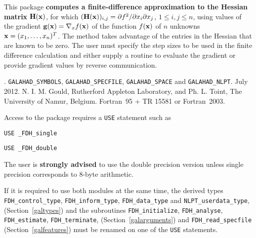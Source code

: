 \documentclass{galahad}
\newcommand{\packagename}{FDH}
\newcommand{\fullpackagename}{\libraryname\_\packagename}
\begin{document}
\galheader


\galsummary
This package
{\bf computes a finite-difference approximation to the Hessian matrix}
${\mathbf{H}}({\mathbf{x}})$, for which
$({\mathbf{H}}({\mathbf{x}}))_{i,j} = \partial f^2 / \partial x_i \partial x_j$,
$1 \leq i, j \leq n$,
using values of the gradient ${\mathbf{g}}({\mathbf{x}}) = \nabla_x f({\mathbf{x}})$
of the function $f({\mathbf{x}})$ of $n$ unknowns ${\mathbf{x}} = (x_1, \ldots, x_n)^T$.
The method takes advantage of the entries in the Hessian that are known to
be zero.  The user must specify the step sizes to be used in the
finite difference calculation and either supply a routine to evaluate
the gradient or provide gradient values by reverse communication.


\galattributes
\galversions{\tt  \fullpackagename\_single, \fullpackagename\_double}.
\galuses
{\tt GALAHAD\_SY\-M\-BOLS},
{\tt GALAHAD\_SP\-ECFILE},
{\tt GALAHAD\_SPACE} and
{\tt GALAHAD\_NLPT}.
\galdate July 2012.
\galorigin N. I. M. Gould, Rutherford Appleton Laboratory,
and Ph. L. Toint, The University of Namur, Belgium.
\gallanguage Fortran~95 + TR 15581 or Fortran~2003.


\galhowto


Access to the package requires a {\tt USE} statement such as

\medskip{}

\hspace{8mm} {\tt USE \fullpackagename\_single}

\medskip{}

\hspace{8mm} {\tt USE  \fullpackagename\_double}

\medskip

\noindent
The user is {\bf strongly advised} to use the double
precision version unless single precision corresponds to 8-byte arithmetic.

If it is required to use both modules at the same time, the derived types
{\tt \packagename\_control\_type},
{\tt \packagename\_inform\_type},
{\tt \packagename\_data\_type}
and
{\tt NLPT\_userdata\_type},
(Section~\ref{galtypes})
and the subroutines
{\tt \packagename\_initialize},
{\tt \packagename\_\-analyse},
{\tt \packagename\_\-estimate},
{\tt \packagename\_terminate},
(Section~\ref{galarguments})
and
{\tt \packagename\_read\_specfile}
(Section~\ref{galfeatures})
must be renamed on one of the {\tt USE} statements.
\end{document}
